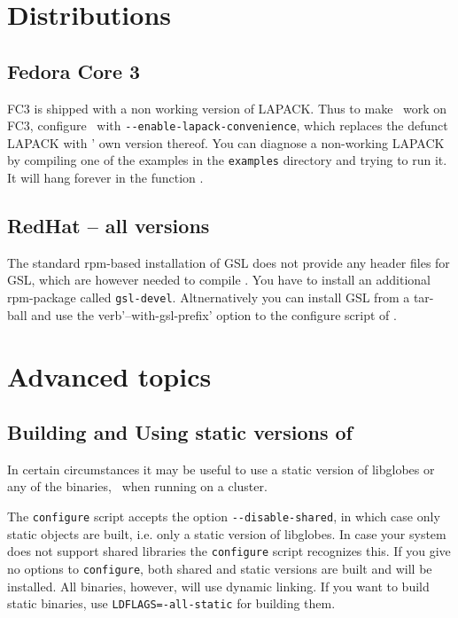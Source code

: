 \begin{appendix}
\section*{Distributions}

\subsection*{Fedora Core 3}

FC3 is shipped with a non working version of LAPACK. Thus to
make \GLOBES\ work on FC3, configure \GLOBES\ with \verb'--enable-lapack-convenience', which
replaces the defunct LAPACK with \GLOBES' own version thereof. You can diagnose a 
non-working LAPACK by compiling one of the examples in the \verb^examples^ directory and 
trying to run it. It will hang forever in the function . 

\subsection*{RedHat -- all versions}

The standard rpm-based installation of GSL does not provide any header files for GSL, 
which are however needed to compile \GLOBES. You have to install an additional rpm-package
called \verb'gsl-devel'. Altnernatively you can install GSL from a tar-ball and use the 
verb'--with-gsl-prefix' option to the configure script of \GLOBES.


\section*{Advanced topics}


\subsection*{Building and Using static versions of \GLOBES}

In certain circumstances it may be useful to use a static version of libglobes
or any of the binaries, \eg\ when running on a cluster.

   The \verb+configure+ script accepts the option \verb+--disable-shared+, in which
case only static objects are built, i.e. only a static version of libglobes. 
In case your system does not support shared libraries the \verb+configure+ script 
recognizes this. If you give no options to \verb+configure+, both shared and static 
versions are built and will be installed. All binaries, however, will use dynamic 
linking. If you want to build static binaries, use \verb+LDFLAGS=-all-static+ for building
them.


\end{appendix}
